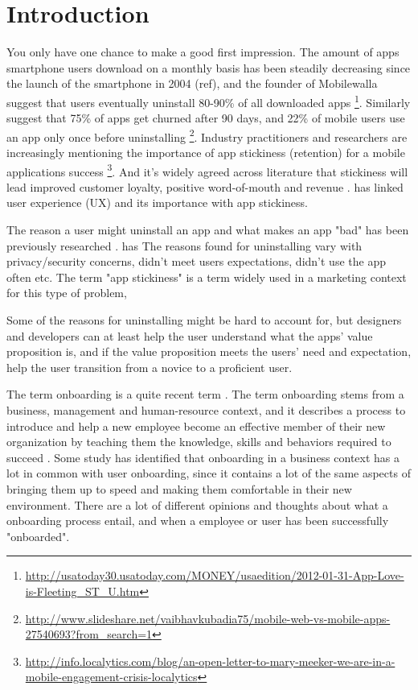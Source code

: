 \chapter{Introduction}
\label{chap:introduction}

You only have one chance to make a good first impression. The amount of apps smartphone users download on a monthly basis has been steadily decreasing since the launch of the smartphone in 2004 (ref), and the founder of Mobilewalla suggest that users eventually uninstall 80-90\% of all downloaded apps \footnote{\url{http://usatoday30.usatoday.com/MONEY/usaedition/2012-01-31-App-Love-is-Fleeting\_ST\_U.htm}}. Similarly \cite{Perro2016} suggest that 75\% of apps get churned after 90 days, and 22\% of mobile users use an app only once before uninstalling \footnote{\url{http://www.slideshare.net/vaibhavkubadia75/mobile-web-vs-mobile-apps-27540693?from_search=1}}. Industry practitioners and researchers are increasingly mentioning the importance of app stickiness (retention) for a mobile applications success \cite{Perro2016} \cite{IGIGlobal2016} \cite{Kim2016} \footnote{\url{http://info.localytics.com/blog/an-open-letter-to-mary-meeker-we-are-in-a-mobile-engagement-crisis-localytics}}. And it's widely agreed across literature that stickiness will lead improved customer loyalty, positive word-of-mouth and revenue \cite{Reichheld2000} \cite{Srinivasan2002} \cite{Hsu2016a}. \cite{IGIGlobal2016} has linked user experience (UX) and its importance with app stickiness.

The reason a user might uninstall an app and what makes an app "bad" has been previously researched \cite{Lin2012} \cite{Shklovski} \cite{Song2014}. \cite{IGIGlobal2016} has  The reasons found for uninstalling vary with privacy/security concerns, didn't meet users expectations, didn't use the app often etc. The term "app stickiness" is a term widely used in a marketing context for this type of problem,

Some of the reasons for uninstalling might be hard to account for, but designers and developers can at least help the user understand what the apps' value proposition is, and if the value proposition meets the users' need and expectation, help the user transition from a novice to a proficient user.

The term onboarding is a quite recent term \cite{Dai2007}. The term onboarding stems from a business, management and human-resource context, and it describes a process to introduce and help a new employee become an effective member of their new organization by teaching them the knowledge, skills and behaviors required to succeed \cite{Bauer2011}. Some study has identified that onboarding in a business context has a lot in common with user onboarding, since it contains a lot of the same aspects of bringing them up to speed and making them comfortable in their new environment. There are a lot of different opinions and thoughts about what a onboarding process entail, and when a employee or user has been successfully "onboarded".

